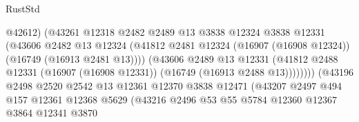 \begin{lexlean}{RustStd}
\begin{coremodule}
                                          @42612)
                                        (@43261
                                          @12318
                                          @2482
                                          @2489
                                          @13
                                          @3838
                                          @12324
                                          @3838
                                          @12331
                                          (@43606
                                            @2482
                                            @13
                                            @12324
                                            (@41812
                                              @2481
                                              @12324
                                              (@16907 (@16908 @12324))
                                              (@16749 (@16913 @2481 @13))))
                                          (@43606
                                            @2489
                                            @13
                                            @12331
                                            (@41812
                                              @2488
                                              @12331
                                              (@16907 (@16908 @12331))
                                              (@16749 (@16913 @2488 @13))))))))
                                  (@43196
                                    @2498
                                    @2520
                                    @2542
                                    @13
                                    @12361
                                    @12370
                                    @3838
                                    @12471
                                    (@43207
                                      @2497
                                      @494
                                      @157
                                      @12361
                                      @12368
                                      @5629
                                      (@43216
                                        @2496
                                        @53
                                        @55
                                        @5784
                                        @12360
                                        @12367
                                        @3864
                                        @12341
                                        @3870

\end{coremodule}
\end{lexlean}
